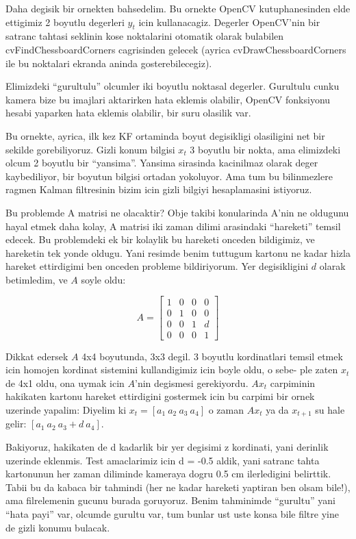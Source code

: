 \documentclass[12pt,fleqn]{article}
\begin{document}
Daha degisik bir ornekten bahsedelim. Bu ornekte OpenCV kutuphanesinden
elde ettigimiz 2 boyutlu degerleri $y_t$ icin kullanacagiz. Degerler
OpenCV'nin bir satranc tahtasi seklinin kose noktalarini otomatik olarak
bulabilen cvFindChessboardCorners cagrisinden gelecek (ayrica
cvDrawChessboardCorners ile bu noktalari ekranda aninda gosterebilecegiz).

Elimizdeki ``gurultulu'' olcumler iki boyutlu noktasal degerler. Gurultulu
cunku kamera bize bu imajlari aktarirken hata eklemis olabilir, OpenCV
fonksiyonu hesabi yaparken hata eklemis olabilir, bir suru olasilik var.

Bu ornekte, ayrica, ilk kez KF ortaminda boyut degisikligi olasiligini net
bir sekilde gorebiliyoruz. Gizli konum bilgisi $x_t$ 3 boyutlu bir nokta,
ama elimizdeki olcum 2 boyutlu bir ``yansima''. Yansima sirasinda
kacinilmaz olarak deger kaybediliyor, bir boyutun bilgisi ortadan
yokoluyor. Ama tum bu bilinmezlere ragmen Kalman filtresinin bizim icin
gizli bilgiyi hesaplamasini istiyoruz.

Bu problemde A matrisi ne olacaktir? Obje takibi konularinda A'nin ne
oldugunu hayal etmek daha kolay, A matrisi iki zaman dilimi arasindaki
``hareketi'' temsil edecek. Bu problemdeki ek bir kolaylik bu hareketi
onceden bildigimiz, ve hareketin tek yonde oldugu. Yani resimde benim
tuttugum kartonu ne kadar hizla hareket ettirdigimi ben onceden probleme
bildiriyorum. Yer degisikligini $d$ olarak betimledim, ve $A$ soyle oldu:

\[ A = 
\left[\begin{array}{rrrr}
1 & 0 & 0 & 0 \\
0 & 1 & 0 & 0 \\
0 & 0 & 1 & d \\
0 & 0 & 0 & 1
\end{array}\right]
 \]

Dikkat edersek $A$ 4x4 boyutunda, 3x3 degil. 3 boyutlu kordinatlari temsil
etmek icin homojen kordinat sistemini kullandigimiz icin boyle oldu, o
sebe- ple zaten $x_t$ de 4x1 oldu, ona uymak icin $A$'nin degismesi
gerekiyordu. $Ax_t$ carpiminin hakikaten kartonu hareket ettirdigini
gostermek icin bu carpimi bir ornek uzerinde yapalim: Diyelim 
ki $x_t = [
 a_1 \ a_2 \ a_3 \ a_4 ]$ o zaman $Ax_t$ ya da $x_{t+1}$ su hale gelir: $[
 a_1 \ a_2 \ a_3+d \ a_4 ]$.

Bakiyoruz, hakikaten de d kadarlik bir yer degisimi z kordinati, yani
derinlik uzerinde eklenmis. Test amaclarimiz icin d = -0.5 aldik, yani
satranc tahta kartonunun her zaman diliminde kameraya dogru 0.5 cm
ilerledigini belirttik. Tabii bu da kabaca bir tahmindi (her ne kadar
hareketi yaptiran ben olsam bile!), ama filrelemenin gucunu burada
goruyoruz. Benim tahminimde ``gurultu'' yani ``hata payi'' var, olcumde
gurultu var, tum bunlar ust uste konsa bile filtre yine de gizli konumu
bulacak.
\end{document}

